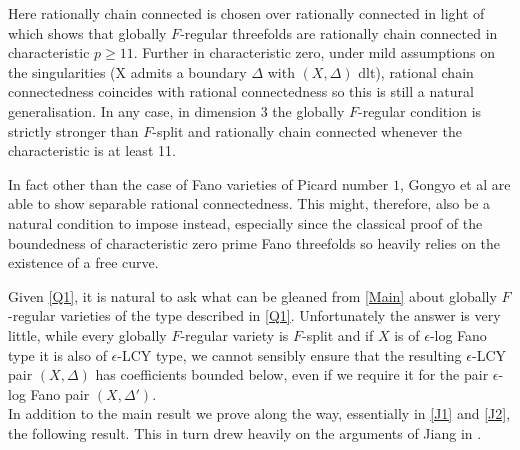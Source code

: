 \documentclass[a4paper,12pt]{book}
\newcommand{\D}{\Delta}
\begin{document}
\begin{remark}
	Here rationally chain connected is chosen over rationally connected in light of \cite{gongyo2015rational} which shows that globally $F$-regular threefolds are rationally chain connected in characteristic $p\geq 11$. Further in characteristic zero, under mild assumptions on the singularities (X admits a boundary $\D$ with $(X,\D)$ dlt), rational chain connectedness coincides with rational connectedness so this is still a natural generalisation. In any case, in dimension $3$ the globally $F$-regular condition is strictly stronger than $F$-split and rationally chain connected whenever the characteristic is at least 11. 
	
	In fact other than the case of Fano varieties of Picard number $1$, Gongyo et al are able to show separable rational connectedness. This might, therefore, also be a natural condition to impose instead, especially since the classical proof of the boundedness of characteristic zero prime Fano threefolds so heavily relies on the existence of a free curve. 
\end{remark}

Given \autoref{Q1}, it is natural to ask what can be gleaned from \autoref{Main} about globally $F$-regular varieties of the type described in \autoref{Q1}. Unfortunately the answer is very little, while every globally $F$-regular variety is $F$-split and if $X$ is of $\epsilon$-log Fano type it is also of $\epsilon$-LCY type, we cannot sensibly ensure that the resulting $\epsilon$-LCY pair $(X,\Delta)$ has coefficients bounded below, even if we require it for the pair $\epsilon$-log Fano pair $(X,\Delta')$.\\

In addition to the main result we prove along the way, essentially in \autoref{J1} and \autoref{J2}, the following result. This in turn drew heavily on the arguments of Jiang in \cite{jiang2014boundedness}.
\end{document}
